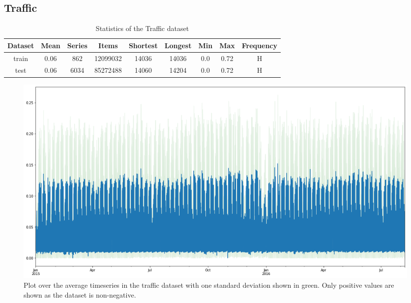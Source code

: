 \clearpage
\subsection{Traffic}

\begin{table}[htb]
    \begin{tabular}{||c | c c c c c c c c ||}
        \hline
        Dataset & Mean & Series & Items    & Shortest & Longest & Min & Max  & Frequency \\ [0.5ex]
        \hline\hline
        train   & 0.06 & 862    & 12099032 & 14036    & 14036   & 0.0 & 0.72 & H         \\
        \hline
        test    & 0.06 & 6034   & 85272488 & 14060    & 14204   & 0.0 & 0.72 & H         \\
        \hline
    \end{tabular}
    \caption{Statistics of the Traffic dataset}
\end{table}

\begin{figure}[htb]
    \centering
    \includegraphics[width=\linewidth]{./img/traffic_plot.png}
    \caption{Plot over the average timeseries in the traffic dataset with one standard deviation shown in green. Only positive values are shown as the dataset is non-negative.}
    \label{fig:traffic_plot}
    \endminipage\hfill
\end{figure}

